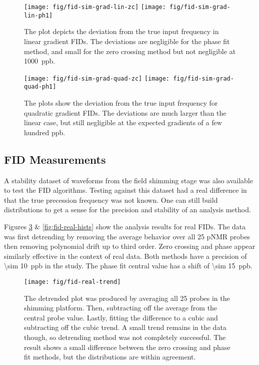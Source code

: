 \begin{figure}
\centering
\texttt{[image: fig/fid-sim-grad-lin-zc]}
\texttt{[image: fig/fid-sim-grad-lin-ph1]}
\caption{
    The plot depicts the deviation from the true input frequency in linear gradient FIDs.  The deviations are negligible for the phase fit method, and small for the zero crossing method but not negligible at \SI{1000}{ppb}.
    \label{fig:fid-sim-grad-lin-results}
} 
\end{figure}

\begin{figure}
\centering
\texttt{[image: fig/fid-sim-grad-quad-zc]}
\texttt{[image: fig/fid-sim-grad-quad-ph1]}
\caption{
    The plots show the deviation from the true input frequency for quadratic gradient FIDs.  The deviations are much larger than the linear case, but still negligible at the expected gradients of a few hundred ppb.
    \label{fig:fid-sim-grad-quad-results}
}
\end{figure}

\subsection{FID Measurements}
A stability dataset of waveforms from the field shimming stage was also available to test the FID algorithms.  Testing against this dataset had a real difference in that the true precession frequency was not known.  One can still build distributions to get a sense for the precision and stability of an analysis method.

Figures \ref{fig:fid-real-trend} \& \ref{fig:fid-real-hists} show the analysis results for real FIDs.  The data was first detrending by removing the average behavior over all 25 pNMR probes then removing polynomial drift up to third order.  Zero crossing and phase appear similarly effective in the context of real data.  Both methods have a precision of \SI{\sim 10}{ppb} in the study.  The phase fit central value has a shift of \SI{\sim 15}{ppb}.

\begin{figure}
\centering
\texttt{[image: fig/fid-real-trend]}
\caption{
    The detrended plot was produced by averaging all 25 probes in the shimming platform.  Then, subtracting off the average from the central probe value.  Lastly, fitting the difference to a cubic and subtracting off the cubic trend.  A small trend remains in the data though, so detrending method was not completely successful.  The result shows a small difference between the zero crossing and phase fit methods, but the distributions are within agreement.
    \label{fig:fid-real-trend}
}
\end{figure}

